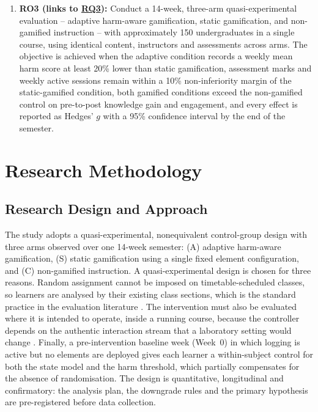 \documentclass[12pt,a4paper]{article}
\DeclareRobustCommand{\rqlink}[1]{\texorpdfstring{\hyperref[rq:rq#1]{RQ#1}}{RQ#1}}
\begin{document}
\begin{justify}
\begin{enumerate}
    \item \textbf{RO3 (links to \rqlink{3}):} Conduct a 14-week, three-arm quasi-experimental
    evaluation -- adaptive harm-aware gamification, static gamification, and non-gamified
    instruction -- with approximately 150 undergraduates in a single course, using identical
    content, instructors and assessments across arms. The objective is achieved when the adaptive
    condition records a weekly mean harm score at least 20\% lower than static gamification,
    assessment marks and weekly active sessions remain within a 10\% non-inferiority margin of the
    static-gamified condition, both gamified conditions exceed the non-gamified control on
    pre-to-post knowledge gain and engagement, and every effect is reported as Hedges' $g$ with a
    95\% confidence interval by the end of the semester.
\end{enumerate}



\section{Research Methodology}

\subsection{Research Design and Approach}
\label{sec:design}


The study adopts a quasi-experimental, nonequivalent control-group design with three arms
observed over one 14-week semester: (A) adaptive harm-aware gamification, (S) static gamification
using a single fixed element configuration, and (C) non-gamified instruction. A quasi-experimental
design is chosen for three reasons. Random assignment cannot be imposed on timetable-scheduled
classes, so learners are analysed by their existing class sections, which is the standard practice
in the evaluation literature \parencite{zhang2026gamification,ojonuba2025web}. The intervention
must also be evaluated where it is intended to operate, inside a running course, because the
controller depends on the authentic interaction stream that a laboratory setting would change
\parencite{durmaz2022gamification}. Finally, a pre-intervention baseline week (Week~0) in which
logging is active but no elements are deployed gives each learner a within-subject control for
both the state model and the harm threshold, which partially compensates for the absence of
randomisation. The design is quantitative, longitudinal and confirmatory: the analysis plan, the
downgrade rules and the primary hypothesis are pre-registered before data collection.


\end{justify}
\end{document}
